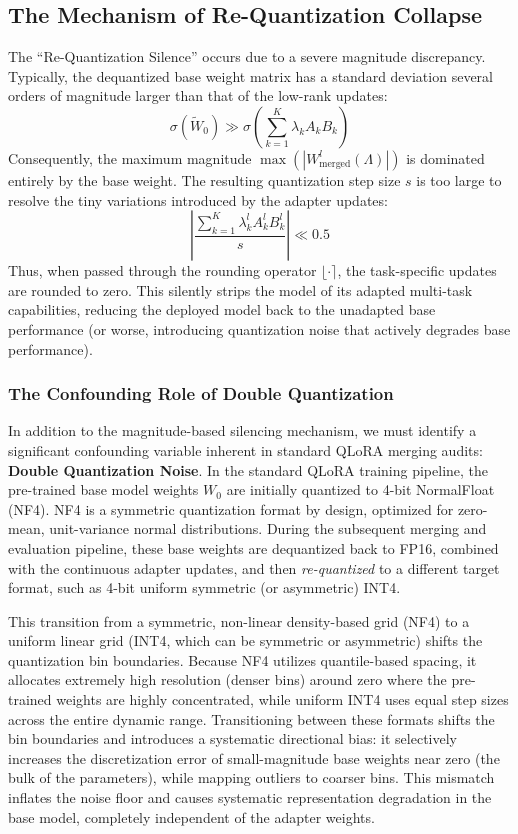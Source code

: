 \subsection{The Mechanism of Re-Quantization Collapse}
The ``Re-Quantization Silence'' occurs due to a severe magnitude discrepancy. Typically, the dequantized base weight matrix has a standard deviation several orders of magnitude larger than that of the low-rank updates:
\begin{equation}
  \sigma(\tilde{W}_0) \gg \sigma\left(\sum_{k=1}^K \lambda_k A_k B_k\right)
\end{equation}
Consequently, the maximum magnitude $\max(|W^l_{\text{merged}}(\Lambda)|)$ is dominated entirely by the base weight. The resulting quantization step size $s$ is too large to resolve the tiny variations introduced by the adapter updates:
\begin{equation}
  \left| \frac{\sum_{k=1}^K \lambda^l_k A^l_k B^l_k}{s} \right| \ll 0.5
\end{equation}
Thus, when passed through the rounding operator $\lfloor \cdot \rceil$, the task-specific updates are rounded to zero. This silently strips the model of its adapted multi-task capabilities, reducing the deployed model back to the unadapted base performance (or worse, introducing quantization noise that actively degrades base performance).

\subsubsection{The Confounding Role of Double Quantization}
In addition to the magnitude-based silencing mechanism, we must identify a significant confounding variable inherent in standard QLoRA merging audits: \textbf{Double Quantization Noise}. In the standard QLoRA training pipeline, the pre-trained base model weights $W_0$ are initially quantized to 4-bit NormalFloat (NF4). NF4 is a symmetric quantization format by design, optimized for zero-mean, unit-variance normal distributions. During the subsequent merging and evaluation pipeline, these base weights are dequantized back to FP16, combined with the continuous adapter updates, and then \emph{re-quantized} to a different target format, such as 4-bit uniform symmetric (or asymmetric) INT4. 

This transition from a symmetric, non-linear density-based grid (NF4) to a uniform linear grid (INT4, which can be symmetric or asymmetric) shifts the quantization bin boundaries. Because NF4 utilizes quantile-based spacing, it allocates extremely high resolution (denser bins) around zero where the pre-trained weights are highly concentrated, while uniform INT4 uses equal step sizes across the entire dynamic range. Transitioning between these formats shifts the bin boundaries and introduces a systematic directional bias: it selectively increases the discretization error of small-magnitude base weights near zero (the bulk of the parameters), while mapping outliers to coarser bins. This mismatch inflates the noise floor and causes systematic representation degradation in the base model, completely independent of the adapter weights.

